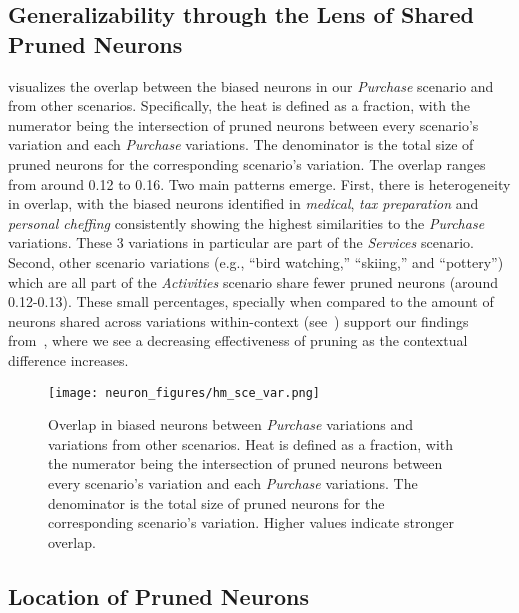 \subsection{Generalizability through the Lens of Shared Pruned Neurons}
\label{sec:gen}

 visualizes the overlap between the biased neurons in our \textit{Purchase} scenario and from other scenarios. Specifically, the heat is defined as a fraction, with the numerator being the intersection of pruned neurons between every scenario's variation and each \textit{Purchase} variations. The denominator is the total size of pruned neurons for the corresponding scenario's variation. The overlap ranges from around 0.12 to 0.16. Two main patterns emerge. First, there is heterogeneity in overlap, with the biased neurons identified in \textit{medical}, \textit{tax preparation} and \textit{personal cheffing} consistently showing the highest similarities to the \textit{Purchase} variations. These 3 variations in particular are part of the \textit{Services} scenario. Second, other scenario variations (e.g., ``bird watching,'' ``skiing,'' and ``pottery'') which are all part of the \textit{Activities} scenario share fewer pruned neurons (around 0.12-0.13). These small percentages, specially when compared to the amount of neurons shared across variations within-context (see~) support our findings from~, where we see a decreasing effectiveness of pruning as the contextual difference increases.

\begin{figure}[t]
  \centering
  \texttt{[image: neuron\_figures/hm\_sce\_var.png]}
  \caption{Overlap in biased neurons between \textit{Purchase} variations and variations from other scenarios. Heat is defined as a fraction, with the numerator being the intersection of pruned neurons between every scenario's variation and each \textit{Purchase} variations. The denominator is the total size of pruned neurons for the corresponding scenario's variation. Higher values indicate stronger overlap. }
  \label{fig-hm-sce_var}
\end{figure}





\subsection{Location of Pruned Neurons}

